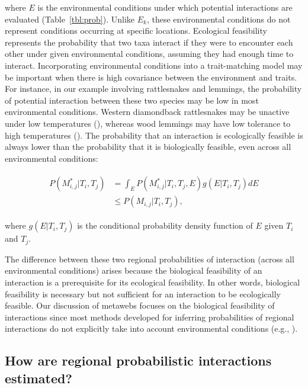 where $E$ is the environmental conditions under which potential interactions are
evaluated (Table~\ref{tbl:prob}). Unlike $E_k$, these environmental conditions
do not represent conditions occurring at specific locations. Ecological
feasibility represents the probability that two taxa interact if they were to
encounter each other under given environmental conditions, assuming they had
enough time to interact. Incorporating environmental conditions into a
trait-matching model may be important when there is high covariance between the
environment and traits. For instance, in our example involving rattlesnakes and
lemmings, the probability of potential interaction between these two species may
be low in most environmental conditions. Western diamondback rattlesnakes may be
unactive under low temperatures (\cite{Kissner1997Rattling}), whereas wood
lemmings may have low tolerance to high temperatures
(\cite{Kausrud2008Linking}). The probability that an interaction is ecologically
feasible is always lower than the probability that it is biologically feasible,
even across all environmental conditions:

\begin{eqnarray}
\begin{split}
  \label{eq:feasibility}
  P(M^*_{i, j} | T_i, T_j) & = \int_{E}P(M^*_{i, j} | T_i, T_j, E) g(E|T_i, T_j) dE \\
  & \leq P(M_{i, j} |
T_i, T_j),
\end{split}
\end{eqnarray}

where $g(E | T_i, T_j)$ is the conditional probability density function of $E$
given $T_i$ and $T_j$. 

The difference between these two regional probabilities of interaction
(across all environmental conditions) arises because the biological
feasibility of an interaction is a prerequisite for its ecological feasibility.
In other words, biological feasibility is necessary but not sufficient for an
interaction to be ecologically feasible. Our discussion of metawebs focuses on
the biological feasibility of interactions since most methods developed for
inferring probabilities of regional interactions do not explicitly take into
account environmental conditions (e.g., \cite{Strydom2022Food}). 

\subsection{How are regional probabilistic interactions estimated?}

